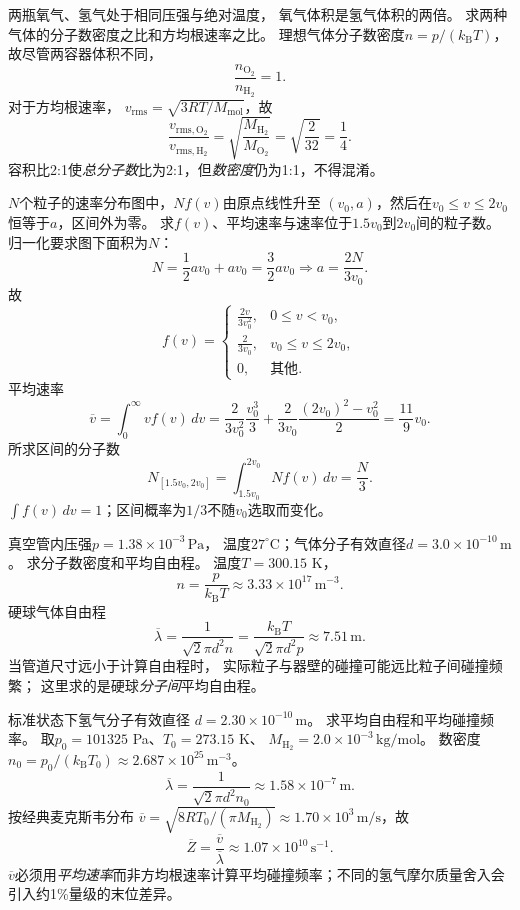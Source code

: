 \problemtext 两瓶氧气、氢气处于相同压强与绝对温度，
氧气体积是氢气体积的两倍。
求两种气体的分子数密度之比和方均根速率之比。
\workings
理想气体分子数密度$n=p/(k_{\mathrm B}T)$，
故尽管两容器体积不同，
\[
\boxed{\frac{n_{\mathrm{O_2}}}{n_{\mathrm{H_2}}}=1}.
\]
对于方均根速率，
$v_{\mathrm{rms}}=\sqrt{3RT/M_{\mathrm{mol}}}$，故
\[
\boxed{\frac{v_{\mathrm{rms,O_2}}}{v_{\mathrm{rms,H_2}}}
=\sqrt{\frac{M_{\mathrm{H_2}}}{M_{\mathrm{O_2}}}}
=\sqrt{\frac{2}{32}}=\frac14}.
\]
\crosscheck 容积比2:1使\emph{总分子数}比为2:1，但\emph{数密度}仍为1:1，不得混淆。

\problemtext $N$个粒子的速率分布图中，$Nf(v)$由原点线性升至
$(v_0,a)$，然后在$v_0\le v\le2v_0$恒等于$a$，区间外为零。
求$f(v)$、平均速率与速率位于$1.5v_0$到$2v_0$间的粒子数。
\workings
归一化要求图下面积为$N$：
\[
N=\frac12av_0+av_0=\frac32av_0
\Longrightarrow a=\frac{2N}{3v_0}.
\]
故
\[
\boxed{f(v)=
\begin{cases}
\frac{2v}{3v_0^2},&0\le v<v_0,\\
\frac{2}{3v_0},&v_0\le v\le2v_0,\\
0,&\text{其他}.
\end{cases}}
\]
平均速率
\[
\overline v=\int_0^\infty v f(v)\,dv
=\frac{2}{3v_0^2}\frac{v_0^3}{3}
+\frac{2}{3v_0}\frac{(2v_0)^2-v_0^2}{2}
=\boxed{\frac{11}{9}v_0}.
\]
所求区间的分子数
\[
\boxed{N_{[1.5v_0,2v_0]}
=\int_{1.5v_0}^{2v_0}Nf(v)\,dv
=\frac N3}.
\]
\crosscheck $\int f(v)\,dv=1$；区间概率为$1/3$不随$v_0$选取而变化。

\problemtext 真空管内压强$p=1.38\times10^{-3}\,\mathrm{Pa}$，
温度$27^\circ\mathrm C$；气体分子有效直径$d=3.0\times10^{-10}\,\mathrm m$。
求分子数密度和平均自由程。
\workings
温度$T=300.15$ K，
\[
\boxed{n=\frac p{k_{\mathrm B}T}
\approx3.33\times10^{17}\,\mathrm{m^{-3}}}.
\]
硬球气体自由程
\[
\boxed{\overline\lambda
=\frac{1}{\sqrt2\pi d^2n}
=\frac{k_{\mathrm B}T}{\sqrt2\pi d^2p}
\approx7.51\,\mathrm m}.
\]
\crosscheck 当管道尺寸远小于计算自由程时，
实际粒子与器壁的碰撞可能远比粒子间碰撞频繁；
这里求的是硬球\emph{分子间}平均自由程。

\problemtext 标准状态下氢气分子有效直径
$d=2.30\times10^{-10}\,\mathrm m$。
求平均自由程和平均碰撞频率。
\workings
取$p_0=101325$ Pa、$T_0=273.15$ K、
$M_{\mathrm{H_2}}=2.0\times10^{-3}\,\mathrm{kg/mol}$。
数密度
$n_0=p_0/(k_{\mathrm B}T_0)\approx2.687\times10^{25}\,\mathrm{m^{-3}}$。
\[
\boxed{\overline\lambda=
\frac{1}{\sqrt2\pi d^2n_0}
\approx1.58\times10^{-7}\,\mathrm m}.
\]
按经典麦克斯韦分布
$\overline v=\sqrt{8RT_0/(\pi M_{\mathrm{H_2}})}
\approx1.70\times10^3\,\mathrm{m/s}$，故
\[
\boxed{\overline Z=\frac{\overline v}{\overline\lambda}
\approx1.07\times10^{10}\,\mathrm{s^{-1}}}.
\]
\crosscheck $\overline v$必须用\emph{平均速率}而非方均根速率计算平均碰撞频率；不同的氢气摩尔质量舍入会引入约1\%量级的末位差异。
